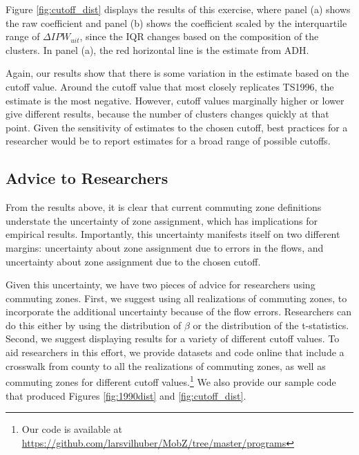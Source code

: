 Figure \ref{fig:cutoff_dist} displays the results of this exercise, where panel (a) shows the raw coefficient and panel (b) shows the coefficient scaled by the interquartile range of $\Delta IPW_{uit}$, since the IQR changes based on the composition of the clusters. In panel (a),  the red horizontal line is the estimate from ADH.

Again, our results show that there is some variation in the estimate based on the cutoff value. Around the cutoff value that most closely replicates TS1996, the estimate is the most negative. However, cutoff values marginally higher or lower give different results, because the number of clusters changes quickly at that point. Given the sensitivity of estimates to the chosen cutoff, best practices for a researcher would be to report estimates for a broad range of possible cutoffs.	

\subsection{Advice to Researchers}

From the results above, it is clear that current commuting zone definitions understate the uncertainty of zone assignment, which has implications for empirical results. Importantly, this uncertainty manifests itself on two different margins: uncertainty about zone assignment due to errors in the flows, and uncertainty about zone assignment due to the chosen cutoff. 

Given this uncertainty, we have two pieces of advice for researchers using commuting zones. First, we suggest using all realizations of commuting zones, to incorporate the additional uncertainty because of the flow errors. Researchers can do this either by using the distribution of $\beta$ or the distribution of the t-statistics. Second, we suggest displaying results for a variety of different cutoff values. To aid researchers in this effort, we provide datasets and code online that include a crosswalk from county to all the realizations of commuting zones, as well as commuting zones for different cutoff values.\footnote{Our code is available at \url{https://github.com/larsvilhuber/MobZ/tree/master/programs}} We also provide our sample code that produced Figures \ref{fig:1990dist} and \ref{fig:cutoff_dist}.



